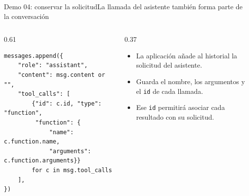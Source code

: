 \begin{frame}[fragile]{Demo 04: conservar la solicitud}{La llamada del asistente también forma parte de la conversación}
	\begin{columns}[T]
		\begin{column}{0.61\textwidth}
			\begin{lstlisting}
messages.append({
    "role": "assistant",
    "content": msg.content or "",
    "tool_calls": [
        {"id": c.id, "type": "function",
         "function": {
             "name": c.function.name,
             "arguments": c.function.arguments}}
        for c in msg.tool_calls
    ],
})
\end{lstlisting}
		\end{column}
		\begin{column}{0.37\textwidth}
			\footnotesize
			\begin{itemize}
				\item La aplicación añade al historial la solicitud del asistente.
				\item Guarda el nombre, los argumentos y el \texttt{id} de cada llamada.
				\item Ese \texttt{id} permitirá asociar cada resultado con su solicitud.
			\end{itemize}
		\end{column}
	\end{columns}
\end{frame}

